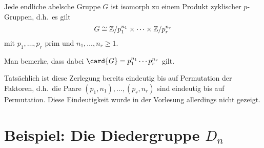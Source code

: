 \begin{corollary}
  Jede endliche abelsche Gruppe $G$ ist isomorph zu einem Produkt zyklischer $p$-Gruppen, d.h.\ es gilt
  \[
          G
    \cong \mathbb{Z}/p_1^{n_1} \times \dotsm \times \mathbb{Z}/p_r^{n_r}
  \]
  mit $p_1, \dotsc, p_r$ prim und $n_1, \dotsc, n_r \geq 1$.
\end{corollary}

Man bemerke, dass dabei $\card{G} = p_1^{n_1} \dotsm p_r^{n_r}$ gilt.

\begin{remark}
  Tatsächlich ist diese Zerlegung bereits eindeutig bis auf Permutation der Faktoren, d.h.\ die Paare $(p_1, n_1), \dotsc, (p_r, n_r)$ sind eindeutig bis auf Permutation.
  Diese Eindeutigkeit wurde in der Vorlesung allerdings nicht gezeigt.
\end{remark}





\section{Beispiel: Die Diedergruppe \texorpdfstring{$D_n$}{D\_n}}

